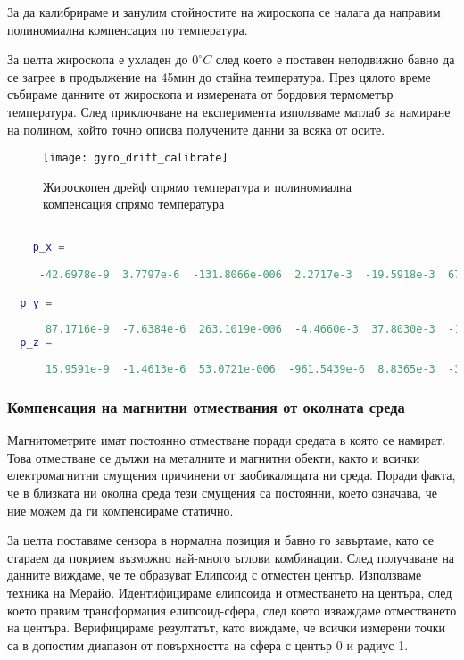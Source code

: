 За да калибрираме и занулим стойностите на жироскопа
се налага да направим полиномиална компенсация по температура.

За целта жироскопа е ухладен до \(0^{\circ}C\)
след което е поставен неподвижно бавно да се загрее в продължение на 45мин до стайна температура.
През цялото време събираме данните от жироскопа и измерената от бордовия термометър температура.
След приключване на експеримента използваме матлаб за намиране на полином,
който точно описва получените данни за всяка от осите.

\begin{figure}[htpb!]
    \centering
    \texttt{[image: gyro\_drift\_calibrate]}
    \caption{Жироскопен дрейф спрямо температура и полиномиална компенсация спрямо температура}
    \label{fig:gyro_drift_calibrate}
\end{figure}

\begin{lstlisting}[language=matlab, caption={Получени полиноми за коменсация на жироскопният дрейф}, label={lst:gyro_drift_poly}]

    p_x =

     -42.6978e-9  3.7797e-6  -131.8066e-006  2.2717e-3  -19.5918e-3  67.9744e-3  95.1384e-3  2.2440e+0

  p_y =
  
      87.1716e-9  -7.6384e-6  263.1019e-006  -4.4660e-3  37.8030e-3  -129.2365e-3  -191.6577e-3  -1.1695e+0
  p_z =
  
      15.9591e-9  -1.4613e-6  53.0721e-006  -961.5439e-6  8.8365e-3  -33.3197e-3  -44.0584e-003  -1.9076e+0

\end{lstlisting}


\FloatBarrier


\subsubsection{Компенсация на магнитни отмествания от околната среда}
\FloatBarrier
Магнитометрите имат постоянно отместване поради средата в която се намират.
Това отместване се дължи на металните и магнитни обекти,
както и всички електромагнитни смущения причинени от заобикалящата ни среда.
Поради факта, че в близката ни околна среда тези смущения са постоянни, което означава, че ние можем да ги компенсираме статично.


За целта поставяме сензора в нормална позиция и бавно го завъртаме, като се стараем да покрием възможно най-много ъглови комбинации.
След получаване на данните виждаме, че те образуват Елипсоид с отместен център.
Използваме техника на Мерайо.
Идентифицираме елипсоида и отместването на центъра,
след което правим трансформация елипсоид-сфера,
след което изваждаме отместването на центъра.
Верифицираме резултатът, като виждаме, че всички измерени точки са в допостим диапазон от повърхността на сфера с център 0 и радиус 1.

